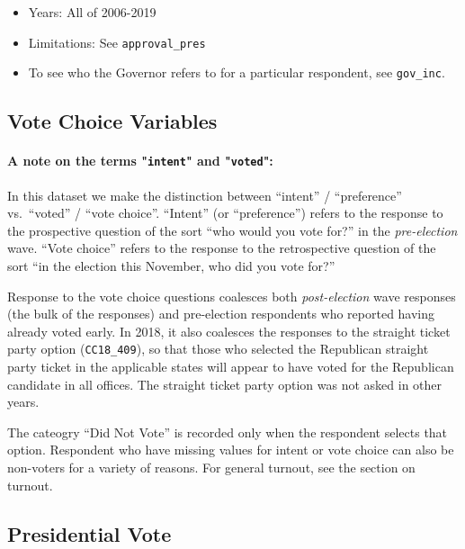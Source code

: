 \documentclass[10pt,article,oneside]{memoir}
\theoremstyle{definition}
\begin{document}
\begin{itemize}
\tightlist
\item
  Years: All of 2006-2019
\item
  Limitations: See \texttt{approval\_pres}
\item
  To see who the Governor refers to for a particular respondent, see
  \texttt{gov\_inc}.
\end{itemize}

\newpage

\hypertarget{vote-choice-variables}{%
\subsection{Vote Choice Variables}\label{vote-choice-variables}}

\paragraph{A note on the terms "\texttt{intent}" and "\texttt{voted}":}

In this dataset we make the distinction between ``intent'' /
``preference'' vs.~``voted'' / ``vote choice''. ``Intent'' (or
``preference'') refers to the response to the prospective question of
the sort ``who would you vote for?'' in the \emph{pre-election} wave.
``Vote choice'' refers to the response to the retrospective question of
the sort ``in the election this November, who did you vote for?''

Response to the vote choice questions coalesces both
\emph{post-election} wave responses (the bulk of the responses) and
pre-election respondents who reported having already voted early. In
2018, it also coalesces the responses to the straight ticket party
option (\texttt{CC18\_409}), so that those who selected the Republican
straight party ticket in the applicable states will appear to have voted
for the Republican candidate in all offices. The straight ticket party
option was not asked in other years.

The cateogry ``Did Not Vote'' is recorded only when the respondent
selects that option. Respondent who have missing values for intent or
vote choice can also be non-voters for a variety of reasons. For general
turnout, see the section on turnout.

\hypertarget{presidential-vote}{%
\subsection{Presidential Vote}\label{presidential-vote}}
\end{document}
